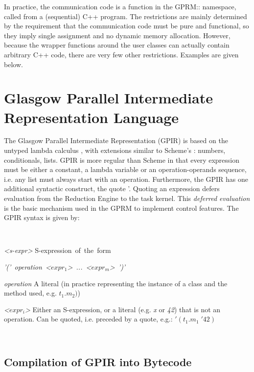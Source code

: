 \documentclass[copyright,creativecommons]{eptcs}
\begin{document}
In practice, the communication code is a function in the GPRM:: namespace,
called from a (sequential) C++ program. The restrictions are mainly
determined by the requirement that the communication code must be
pure and functional, so they imply single assignment and no dynamic
memory allocation. However, because the wrapper functions around the
user classes can actually contain arbitrary C++ code, there are very
few other restrictions. Examples are given below.


\section{Glasgow Parallel Intermediate Representation Language}

The Glasgow Parallel Intermediate Representation (GPIR) is based on
the untyped lambda calculus \cite{pierce2002types}, with extensions
similar to Scheme's \cite{Sussman75scheme:an}: numbers, conditionals,
lists. GPIR is more regular than Scheme in that every expression must
be either a constant, a lambda variable or an operation-operands sequence,
i.e. any list must always start with an operation. Furthermore, the
GPIR has one additional syntactic construct, the quote '. Quoting
an expression defers evaluation from the Reduction Engine to the task
kernel. This \emph{deferred evaluation} is the basic mechanism used
in the GPRM to implement control features. The GPIR syntax is given
by:

~

\emph{<s-expr>} S-expression~of~the~form

\emph{'('~operation~<$expr_{1}$>~...~<$expr_{m}$>~')'}

\emph{operation} A literal (in practice representing the instance
of a class and the method used, e.g. $t_{1}.m_{2})$)

\emph{<}$expr_{i}$\emph{>} Either an S-expression, or a literal (e.g.
\emph{x} or \emph{42}) that is not an operation. Can be quoted, i.e.
preceded by a quote, e.g.: $'(t_{1}.m_{1}\;'42)$

~


\subsection{Compilation of GPIR into Bytecode\label{Compilation-of-GPIR}}
\end{document}

